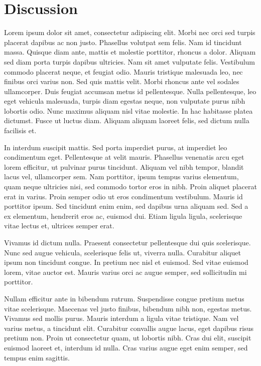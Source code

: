 \documentclass[conference]{IEEEtran}
\begin{document}
\section{Discussion}

Lorem ipsum dolor sit amet, consectetur adipiscing elit. Morbi nec orci sed turpis placerat dapibus ac non justo. Phasellus volutpat sem felis. Nam id tincidunt massa. Quisque diam ante, mattis et molestie porttitor, rhoncus a dolor. Aliquam sed diam porta turpis dapibus ultricies. Nam sit amet vulputate felis. Vestibulum commodo placerat neque, et feugiat odio. Mauris tristique malesuada leo, nec finibus orci varius non. Sed quis mattis velit. Morbi rhoncus ante vel sodales ullamcorper. Duis feugiat accumsan metus id pellentesque. Nulla pellentesque, leo eget vehicula malesuada, turpis diam egestas neque, non vulputate purus nibh lobortis odio. Nunc maximus aliquam nisl vitae molestie. In hac habitasse platea dictumst. Fusce ut luctus diam. Aliquam aliquam laoreet felis, sed dictum nulla facilisis et.

In interdum suscipit mattis. Sed porta imperdiet purus, at imperdiet leo condimentum eget. Pellentesque at velit mauris. Phasellus venenatis arcu eget lorem efficitur, ut pulvinar purus tincidunt. Aliquam vel nibh tempor, blandit lacus vel, ullamcorper sem. Nam porttitor, ipsum tempus varius elementum, quam neque ultricies nisi, sed commodo tortor eros in nibh. Proin aliquet placerat erat in varius. Proin semper odio ut eros condimentum vestibulum. Mauris id porttitor ipsum. Sed tincidunt enim enim, sed dapibus urna aliquam sed. Sed a ex elementum, hendrerit eros ac, euismod dui. Etiam ligula ligula, scelerisque vitae lectus et, ultrices semper erat.

Vivamus id dictum nulla. Praesent consectetur pellentesque dui quis scelerisque. Nunc sed augue vehicula, scelerisque felis ut, viverra nulla. Curabitur aliquet ipsum non tincidunt congue. In pretium nec nisl et euismod. Sed vitae euismod lorem, vitae auctor est. Mauris varius orci ac augue semper, sed sollicitudin mi porttitor.

Nullam efficitur ante in bibendum rutrum. Suspendisse congue pretium metus vitae scelerisque. Maecenas vel justo finibus, bibendum nibh non, egestas metus. Vivamus sed mollis purus. Mauris interdum a ligula vitae tristique. Nam vel varius metus, a tincidunt elit. Curabitur convallis augue lacus, eget dapibus risus pretium non. Proin ut consectetur quam, ut lobortis nibh. Cras dui elit, suscipit euismod laoreet et, interdum id nulla. Cras varius augue eget enim semper, sed tempus enim sagittis.
\end{document}
